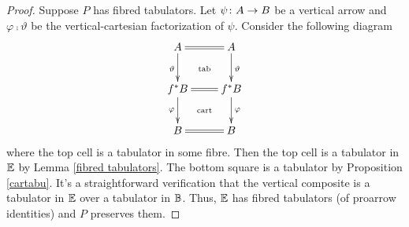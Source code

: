 \documentclass[9pt, leqno]{amsart}
\begin{document}
\begin{proof}
	Suppose $P$ has fibred tabulators. Let $\psi \colon A \to B$ be a vertical arrow and $\varphi \comp \vartheta$ be the vertical-cartesian factorization of $\psi$. Consider the following diagram
	\begin{equation*}
		\xymatrix{
			A \ar[d]_{\vartheta} \ar@{=}[r] \ar@{}[dr]|{\text{tab}} & A \ar[d]^{\vartheta} \\
			f^*B \ar[d]_{\varphi} \ar@{=}[r] \ar@{}[dr]|{\text{cart}} & f^*B \ar[d]^{\varphi} \\
			B \ar@{=}[r] & B
		}
	\end{equation*}
	where the top cell is a tabulator in some fibre. Then the top cell is a tabulator in $\mathbb{E}$ by Lemma \ref{fibred tabulators}. The bottom square is a tabulator by Proposition \ref{cartabu}. It's a straightforward verification that the vertical composite is a tabulator in $\mathbb{E}$ over a tabulator in $\mathbb{B}$. Thus, $\mathbb{E}$ has fibred tabulators (of proarrow identities) and $P$ preserves them.
\end{proof}


\end{document}
